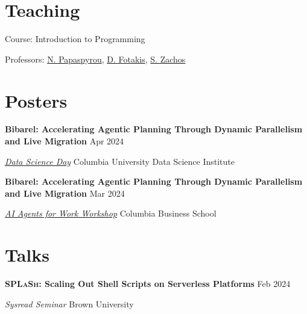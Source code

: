 \documentclass[margin,12pt]{resume}
\newcommand{\subsectionVSpace}{\vspace{3.5ex}\xspace}
\newcommand{\sectionVSpace}{\vspace{1ex}\xspace} %
\newcommand{\pash}{\textsc{PaSh}\xspace}
\newcommand{\sectionVSpaceCorrection}{\vspace{-3.5ex}} %
\newcommand{\splash}{\textsc{SPLaSh}\xspace}
\newcommand{\header}[1]{\textbf{#1}\xspace}
\newcommand{\event}[1]{\textit{#1}\xspace}
\newcommand{\place}[1]{#1\xspace}
\newcommand{\poster}[1]{\header{#1}\xspace}
\newcommand{\singleDate}[1]{#1\xspace}
\newcommand{\stitle}[1]{#1:\xspace}
\newcommand{\talk}[1]{\header{#1}\xspace}
\newenvironment{rSubsection}{}{\par\subsectionVSpace}
\newenvironment{rSection}[1]{\sectionVSpaceCorrection\section{#1}\xspace}{\sectionVSpace\par}
\begin{document}
\begin{resume}
\begin{rSection}{Teaching}
\begin{rSubsection}
            \stitle{Course} Introduction to Programming

            \stitle{Professors} \href{http://www.softlab.ntua.gr/~nickie/}{N. Papaspyrou}, \href{http://www.softlab.ntua.gr/~fotakis/}{D. Fotakis}, \href{https://en.wikipedia.org/wiki/Stathis_Zachos}{S. Zachos}
        \end{rSubsection}
    \end{rSection}

    \begin{rSection}{Posters}
        \begin{rSubsection}
            \poster{Bibarel: Accelerating Agentic Planning Through Dynamic Parallelism and Live Migration} \hfill Apr 2024

            \event{\href{https://datascience.columbia.edu/event/data-science-day-2025/}{Data Science Day}} \hfill \place{Columbia University Data Science Institute}
        \end{rSubsection}

        \begin{rSubsection}
            \poster{Bibarel: Accelerating Agentic Planning Through Dynamic Parallelism and Live Migration} \hfill Mar 2024

            \event{\href{https://daplab.cs.columbia.edu/workshop/}{AI Agents for Work Workshop}} \hfill \place{Columbia Business School}
        \end{rSubsection}
    \end{rSection}

    \begin{rSection}{Talks}


        \begin{rSubsection}
            \talk{\splash: Scaling Out Shell Scripts on Serverless Platforms} \hfill \singleDate{Feb 2024}

            \event{Sysread Seminar} \hfill \place{Brown University}
        \end{rSubsection}



\end{rSection}
\end{resume}
\end{document}
